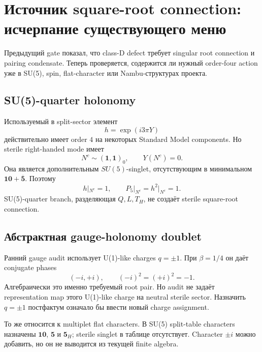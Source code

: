 \chapter{Источник square-root connection: исчерпание существующего меню}

Предыдущий gate показал, что class-D defect требует singular root
connection и pairing condensate. Теперь проверяется, содержится ли нужный
order-four action уже в SU(5), spin, flat-character или Nambu-структурах
проекта.

\section{SU(5)-quarter holonomy}

Используемый в split-sector элемент
\begin{equation}
 h=\exp(i3\pi Y)
\end{equation}
действительно имеет order \(4\) на некоторых Standard Model components.
Но sterile right-handed mode имеет
\begin{equation}
 N^c\sim(\mathbf1,\mathbf1)_0,
 \qquad Y(N^c)=0.
\end{equation}
Она является дополнительным \(SU(5)\)-singlet, отсутствующим в минимальном
\(\mathbf{10}+\overline{\mathbf5}\). Поэтому
\begin{equation}
 h|_{N^c}=1,
 \qquad
 P_5|_{N^c}=h^2|_{N^c}=1.
\end{equation}
SU(5)-quarter branch, разделяющая \(Q,L,T_H\), не создаёт sterile
square-root connection.

\section{Абстрактная gauge-holonomy doublet}

Ранний gauge audit использует U(1)-like charges \(q=\pm1\). При
\(\beta=1/4\) он даёт conjugate phases
\begin{equation}
 (-i,+i),
 \qquad
 (-i)^2=(+i)^2=-1.
\end{equation}
Алгебраически это именно требуемый root pair. Но audit не задаёт
representation map этого U(1)-like charge на neutral sterile sector.
Назначить \(q=\pm1\) постфактум означало бы ввести новый charge assignment.

То же относится к multiplet flat characters. В SU(5) split-table characters
назначены \(\mathbf{10}\), \(\mathbf5\) и \(\mathbf5_H\); sterile singlet в
таблице отсутствует. Character \(\pm i\) можно добавить, но он не выводится
из текущей finite algebra.

